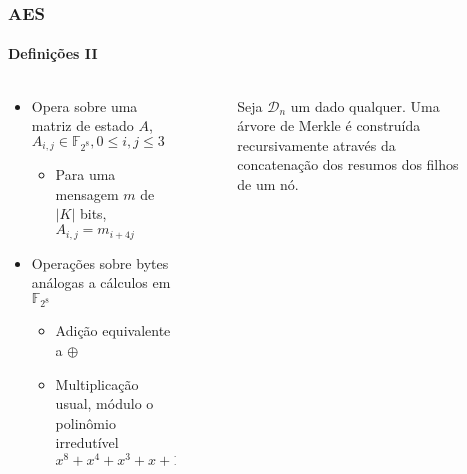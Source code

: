 \documentclass[12pt]{beamer}
\newcommand{\hash}[2][]{\mathcal{H}^{#1}(#2)}
\newcommand{\concat}{\, \vert \vert \,}
\newcommand{\length}[1]{\vert #1 \vert}
\begin{document}
\begin{frame}
    \frametitle{AES}
    \framesubtitle{Definições II}
    
    
    
     \begin{columns}[T]
    \begin{column}{.4\textwidth}
      
    \begin{itemize}
        \item Opera sobre uma matriz de estado $A$, $A_{i,j} \in \mathbb{F}_{2^8}, 0 \leq i, j \leq 3$
        \begin{itemize}
            \item Para uma mensagem $m$ de $\length{K}$ bits, $A_{i,j} = m_{i+4j}$
        \end{itemize}
        \item Operações sobre bytes análogas a cálculos em $\mathbb{F}_{2^8}$
        \begin{itemize}
            \item Adição equivalente a $\oplus$
            \item Multiplicação usual, módulo o polinômio irredutível $x^8 + x^4 + x^3 + x + 1$
        \end{itemize}
    \end{itemize}
    \end{column}
    \begin{column}{.4\textwidth}
      \begin{figure}[ht]
  \centering
        \captionsetup{font=scriptsize}
        \caption*{Seja $\mathcal{D}_n$ um dado qualquer. Uma árvore de Merkle é construída recursivamente através da concatenação dos resumos dos filhos de um nó.}
      \end{figure}
    \end{column}
  \end{columns}
    
    

\end{frame}
\end{document}
